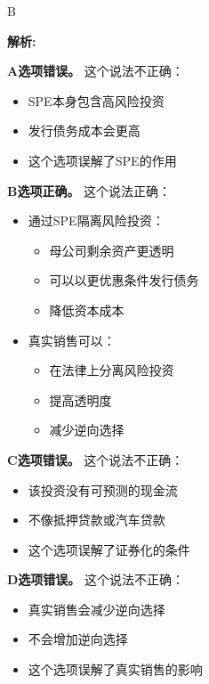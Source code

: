 \documentclass{article}
\newenvironment{explanation}
{\textbf{解析:}\par}
{\par}
\begin{document}
\begin{correctanswer}
    B
\end{correctanswer}

\begin{explanation}
    \textbf{A选项错误。}
    这个说法不正确：
    \begin{itemize}
        \item SPE本身包含高风险投资
        \item 发行债务成本会更高
        \item 这个选项误解了SPE的作用
    \end{itemize}

    \textbf{B选项正确。}
    这个说法正确：
    \begin{itemize}
        \item 通过SPE隔离风险投资：
        \begin{itemize}
            \item 母公司剩余资产更透明
            \item 可以以更优惠条件发行债务
            \item 降低资本成本
        \end{itemize}
        \item 真实销售可以：
        \begin{itemize}
            \item 在法律上分离风险投资
            \item 提高透明度
            \item 减少逆向选择
        \end{itemize}
    \end{itemize}

    \textbf{C选项错误。}
    这个说法不正确：
    \begin{itemize}
        \item 该投资没有可预测的现金流
        \item 不像抵押贷款或汽车贷款
        \item 这个选项误解了证券化的条件
    \end{itemize}

    \textbf{D选项错误。}
    这个说法不正确：
    \begin{itemize}
        \item 真实销售会减少逆向选择
        \item 不会增加逆向选择
        \item 这个选项误解了真实销售的影响
    \end{itemize}
\end{explanation}
\end{document}
